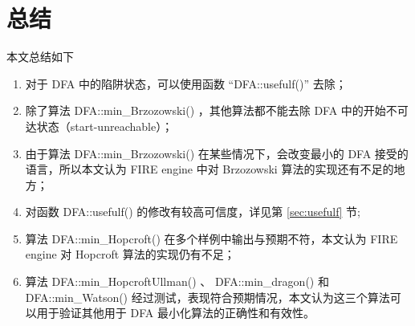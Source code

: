 \chapter{总结}

本文总结如下
\begin{enumerate}
    \item 对于 DFA 中的陷阱状态，可以使用函数 “DFA::usefulf()” 去除；
    \item 除了算法 DFA::min\_Brzozowski() ，其他算法都不能去除 DFA 中的开始不可达状态（start-unreachable）；
    \item 由于算法 DFA::min\_Brzozowski() 在某些情况下，会改变最小的 DFA 接受的语言，所以本文认为 FIRE engine 中对 Brzozowski 算法的实现还有不足的地方；
    \item 对函数 DFA::usefulf() 的修改有较高可信度，详见第 \ref{sec:usefulf} 节;
    \item 算法 DFA::min\_Hopcroft() 在多个样例中输出与预期不符，本文认为 FIRE engine 对 Hopcroft 算法的实现仍有不足；
    \item 算法 DFA::min\_HopcroftUllman() 、 DFA::min\_dragon() 和 DFA::min\_Watson() 经过测试，表现符合预期情况，本文认为这三个算法可以用于验证其他用于 DFA 最小化算法的正确性和有效性。
\end{enumerate}


